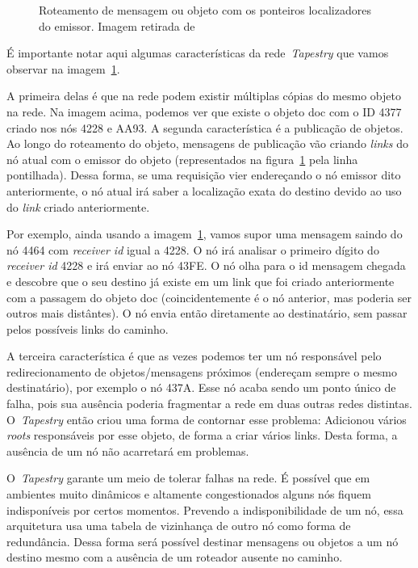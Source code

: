 \begin{figure}
	\caption{Roteamento de mensagem ou objeto com os ponteiros localizadores do emissor. Imagem retirada de~\cite{welzi11}}
	\label{fig:roteamento-obj}
\end{figure}

É importante notar aqui algumas características da rede~\emph{Tapestry} que vamos observar na imagem~\ref{fig:roteamento-obj}.

A primeira delas é que na rede podem existir múltiplas cópias do mesmo objeto na rede. Na imagem acima, podemos ver que existe o objeto doc com o ID 4377 criado nos nós 4228 e AA93. A segunda característica é a publicação de objetos. Ao longo do roteamento do objeto, mensagens de publicação vão criando \emph{links} do nó atual com o emissor do objeto (representados na figura~\ref{fig:roteamento-obj} pela linha pontilhada). Dessa forma, se uma requisição vier endereçando o nó emissor dito anteriormente, o nó atual irá saber a localização exata do destino devido ao uso do \emph{link} criado anteriormente.

Por exemplo, ainda usando a imagem~\ref{fig:roteamento-obj}, vamos supor uma mensagem saindo do nó 4464 com \emph{receiver id} igual a 4228. O nó irá analisar o primeiro dígito do \emph{receiver id} 4228 e irá enviar ao nó 43FE. O nó olha para o id mensagem chegada e descobre que o seu destino já existe em um link que foi criado anteriormente com a passagem do objeto doc (coincidentemente é o nó anterior, mas poderia ser outros mais distântes). O nó envia então diretamente ao destinatário, sem passar pelos possíveis links do caminho.

A terceira característica é que as vezes podemos ter um nó responsável pelo redirecionamento de objetos/mensagens próximos (endereçam sempre o mesmo destinatário), por exemplo o nó 437A. Esse nó acaba sendo um ponto único de falha, pois sua ausência poderia fragmentar a rede em duas outras redes distintas. O~\emph{Tapestry} então criou uma forma de contornar esse problema: Adicionou vários \emph{roots} responsáveis por esse objeto, de forma a criar vários links. Desta forma, a ausência de um nó não acarretará em problemas.

O~\emph{Tapestry} garante um meio de tolerar falhas na rede. É possível que em ambientes muito dinâmicos e altamente congestionados alguns nós fiquem indisponíveis por certos momentos. Prevendo a indisponibilidade de um nó, essa arquitetura usa uma tabela de vizinhança de outro nó como forma de redundância. Dessa forma será possível destinar mensagens ou objetos a um nó destino mesmo com a ausência de um roteador ausente no caminho.

